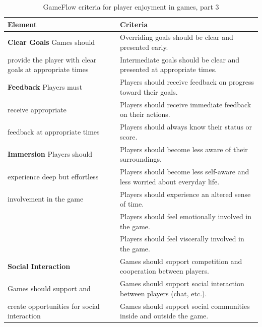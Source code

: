 \begin{table} [H]
\centering
\begin{tabular}{|>{\raggedright}p{}|p{}|}
\hline
\textbf{Element} & \textbf{Criteria} \\ \hline

\textbf{Clear Goals} Games should  & Overriding goals should be clear and presented early. \\ \cline{2-2}
provide the player with clear goals at appropriate times & Intermediate goals should be clear and presented at appropriate times.\\ \hline

\textbf{Feedback} Players must & Players should receive feedback on progress toward their goals.\\ \cline{2-2}
receive appropriate & Players should receive immediate feedback on their actions. \\ \cline{2-2}
feedback at appropriate times& Players should always know their status or score.\\ \hline

\textbf{Immersion} Players should & Players should become less aware of their surroundings. \\ \cline{2-2}
experience deep but effortless  & Players should become less self-aware and less worried about everyday life. \\ \cline{2-2}
involvement in the game & Players should experience an altered sense of time. \\ \cline{2-2}
& Players should feel emotionally involved in the game. \\ \cline{2-2}
& Players should feel viscerally involved in the game.\\ \hline

\textbf{Social Interaction}  & Games should support competition and cooperation between players.\\ \cline{2-2}
Games should support and  & Games should support social interaction between players (chat, etc.). \\ \cline{2-2}
create opportunities for social interaction & Games should support social communities inside and outside the game.\\ \hline
\end{tabular}
\caption[GameFlow criteria for player enjoyment in games, part 1]{GameFlow criteria for player enjoyment in games, part 3 \cite{sweetser}}
\label{tab:gameFlow3}
\end{table} 



